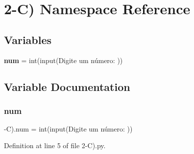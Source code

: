 \section{2-\/C) Namespace Reference}
\label{namespace2-_c_08}
\subsection*{Variables}
\begin{DoxyCompactItemize}
\item 
\textbf{ num} = int(input(\textquotesingle{}Digite um número\+: \textquotesingle{}))
\end{DoxyCompactItemize}


\subsection{Variable Documentation}
\mbox{\label{namespace2-_c_08_aa494f3095acb56858e6a9d5673ddf5e5}} 
\subsubsection{num}
{\footnotesize{}-\/C).num = int(input(\textquotesingle{}Digite um número\+: \textquotesingle{}))}



Definition at line 5 of file 2-\/\+C).\+py.

